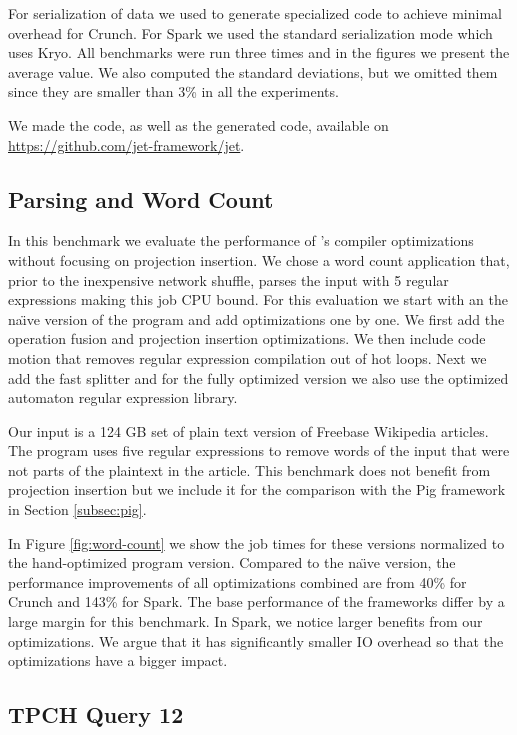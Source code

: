 For serialization of data we used \tool to generate specialized code to achieve minimal overhead for Crunch. 
For Spark we used the standard serialization mode which uses Kryo. All
benchmarks were run three times and in the figures we present the average
value. We also computed the standard deviations, but we omitted them since they
are smaller than 3\% in all the experiments.

We made the \tool code, as well as the generated code, available on
\url{https://github.com/jet-framework/jet}.


\subsection{Parsing and Word Count}
\label{subsec:parsing-word-count}

In this benchmark we evaluate the performance of \tool's compiler optimizations
without focusing on projection insertion. We chose a word count application
that, prior to the inexpensive network shuffle, parses the input with 5 regular
expressions making this job CPU bound. For this evaluation we start with an the
 na\"{\i}ve version of the program and add optimizations one by one. We first add
the operation fusion and projection insertion optimizations. We then include
code motion that removes regular expression compilation out of hot loops. Next
we add the fast splitter and for the fully optimized version we also use the
optimized automaton regular expression library.

Our input is a 124 GB set of plain text version of Freebase Wikipedia articles.
The program uses five regular expressions to remove words of the input that were
not parts of the plaintext in the article. This benchmark does not benefit from
projection insertion but we include it for the comparison
with the Pig framework in Section \ref{subsec:pig}.

In Figure \ref{fig:word-count} we show the job times for these versions
normalized to the hand-optimized program version. Compared to the na\"{\i}ve
version, the performance improvements of
all optimizations combined are from 40\% for Crunch
and 143\% for Spark. The base performance of the frameworks differ
by a large margin for this benchmark. In
Spark, we notice larger benefits from our optimizations. We argue that it has
significantly smaller IO overhead so that the optimizations have a bigger
impact. 

\subsection{TPCH Query 12}
\label{subsec:tpch-query-12}

